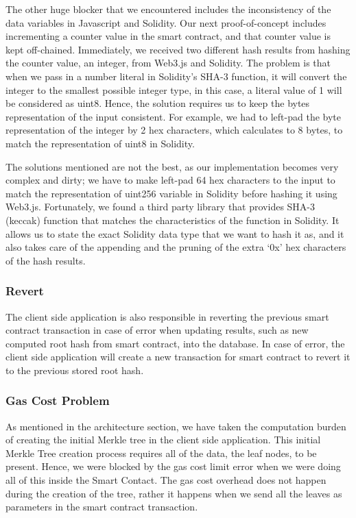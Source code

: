 The other huge blocker that we encountered includes the inconsistency of the data variables in Javascript and Solidity. Our next proof-of-concept includes incrementing a counter value in the smart contract, and that counter value is kept off-chained. Immediately, we received two different hash results from hashing the counter value, an integer, from Web3.js and Solidity. The problem is that when we pass in a number literal in Solidity’s SHA-3 function, it will convert the integer to the smallest possible integer type, in this case, a literal value of 1 will be considered as uint8. Hence, the solution requires us to keep the bytes representation of the input consistent. For example, we had to left-pad the byte representation of the integer by 2 hex characters, which calculates to 8 bytes, to match the representation of uint8 in Solidity. 

The solutions mentioned are not the best, as our implementation becomes very complex and dirty; we have to make left-pad 64 hex characters to the input to match the representation of uint256 variable in Solidity before hashing it using Web3.js. Fortunately, we found a third party library that provides SHA-3 (keccak) function that matches the characteristics of the function in Solidity. \cite{web3utils} It allows us to state the exact Solidity data type that we want to hash it as, and it also takes care of the appending and the pruning of the extra ‘0x’ hex characters of the hash results.

\subsubsection*{Revert}

The client side application is also responsible in reverting the previous smart contract transaction in case of error when updating results, such as new computed root hash from smart contract, into the database. In case of error, the client side application will create a new transaction for smart contract to revert it to the previous stored root hash.

\subsubsection*{Gas Cost Problem}

As mentioned in the architecture section, we have taken the computation burden of creating the initial Merkle tree in the client side application. This initial Merkle Tree creation process requires all of the data, the leaf nodes, to be present. Hence, we were blocked by the gas cost limit error when we were doing all of this inside the Smart Contact. The gas cost overhead does not happen during the creation of the tree, rather it happens when we send all the leaves as parameters in the smart contract transaction. 

